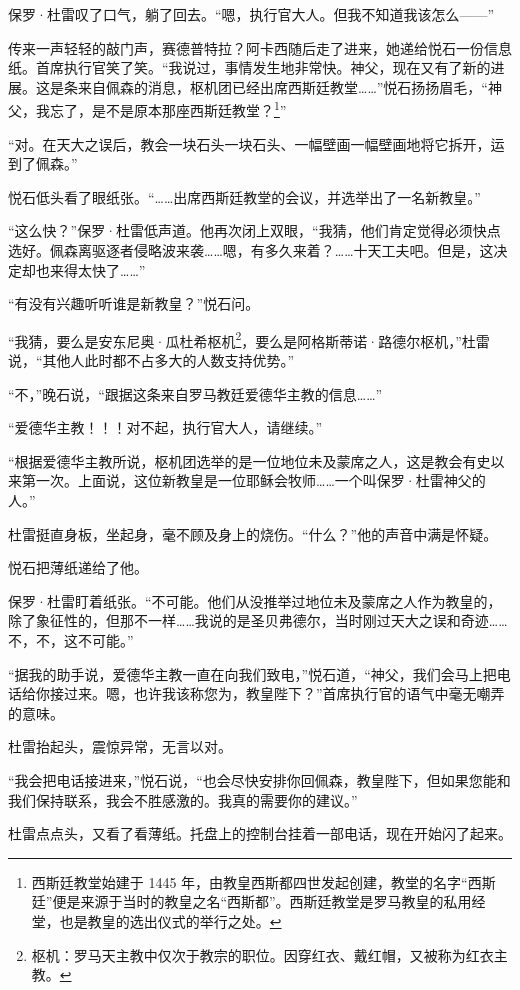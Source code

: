 \documentclass[AutoFakeBold=true]{book}
\begin{document}
保罗·杜雷叹了口气，躺了回去。``嗯，执行官大人。但我不知道我该怎么——''

传来一声轻轻的敲门声，赛德普特拉？阿卡西随后走了进来，她递给悦石一份信息纸。首席执行官笑了笑。``我说过，事情发生地非常快。神父，现在又有了新的进展。这是条来自佩森的消息，枢机团已经出席西斯廷教堂……''悦石扬扬眉毛，``神父，我忘了，是不是原本那座西斯廷教堂？\footnote{西斯廷教堂始建于 1445 年，由教皇西斯都四世发起创建，教堂的名字``西斯廷''便是来源于当时的教皇之名``西斯都''。西斯廷教堂是罗马教皇的私用经堂，也是教皇的选出仪式的举行之处。}''

``对。在天大之误后，教会一块石头一块石头、一幅壁画一幅壁画地将它拆开，运到了佩森。''

悦石低头看了眼纸张。``……出席西斯廷教堂的会议，并选举出了一名新教皇。''

``这么快？''保罗·杜雷低声道。他再次闭上双眼，``我猜，他们肯定觉得必须快点选好。佩森离驱逐者侵略波来袭……嗯，有多久来着？……十天工夫吧。但是，这决定却也来得太快了……''

``有没有兴趣听听谁是新教皇？''悦石问。

``我猜，要么是安东尼奥·瓜杜希枢机\footnote{枢机：罗马天主教中仅次于教宗的职位。因穿红衣、戴红帽，又被称为红衣主教。}，要么是阿格斯蒂诺·路德尔枢机，''杜雷说，``其他人此时都不占多大的人数支持优势。''

``不，''晚石说，``跟据这条来自罗马教廷爱德华主教的信息……''

``爱德华主教！！！对不起，执行官大人，请继续。''

``根据爱德华主教所说，枢机团选举的是一位地位未及蒙席之人，这是教会有史以来第一次。上面说，这位新教皇是一位耶稣会牧师……一个叫保罗·杜雷神父的人。''

杜雷挺直身板，坐起身，毫不顾及身上的烧伤。``什么？''他的声音中满是怀疑。

悦石把薄纸递给了他。

保罗·杜雷盯着纸张。``不可能。他们从没推举过地位未及蒙席之人作为教皇的，除了象征性的，但那不一样……我说的是圣贝弗德尔，当时刚过天大之误和奇迹……不，不，这不可能。''

``据我的助手说，爱德华主教一直在向我们致电，''悦石道，``神父，我们会马上把电话给你接过来。嗯，也许我该称您为，教皇陛下？''首席执行官的语气中毫无嘲弄的意味。

杜雷抬起头，震惊异常，无言以对。

``我会把电话接进来，''悦石说，``也会尽快安排你回佩森，教皇陛下，但如果您能和我们保持联系，我会不胜感激的。我真的需要你的建议。''

杜雷点点头，又看了看薄纸。托盘上的控制台挂着一部电话，现在开始闪了起来。
\end{document}
